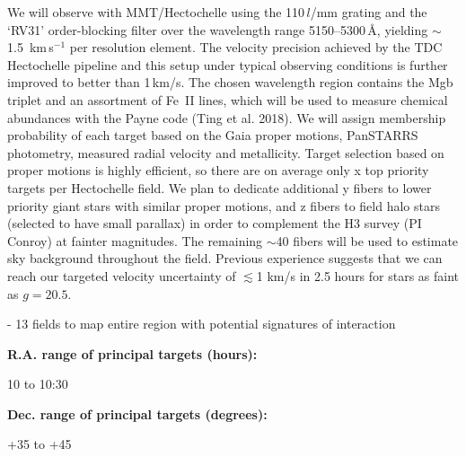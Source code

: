 \documentclass[12pt]{article}
\begin{document}
We will observe with MMT/Hectochelle using the 110\,$l$/mm grating and the `RV31' order-blocking filter over the wavelength range 5150--5300\,\AA, yielding $\sim$1.5~km\,s$^{-1}$ per resolution element.
The velocity precision achieved by the TDC Hectochelle pipeline and this setup under typical observing conditions is further improved to better than 1\,km/s.
The chosen wavelength region contains the Mgb triplet and an assortment of Fe~II lines, which will be used to measure chemical abundances with the Payne code (Ting et al. 2018).
We will assign membership probability of each target based on the Gaia proper motions, PanSTARRS photometry, measured radial velocity and metallicity.
Target selection based on proper motions is highly efficient, so there are on average only x top priority targets per Hectochelle field.
We plan to dedicate additional y fibers to lower priority giant stars with similar proper motions, and z fibers to field halo stars (selected to have small parallax) in order to complement the H3 survey (PI Conroy) at fainter magnitudes.
The remaining $\sim$40 fibers will be used to estimate sky background throughout the field.
Previous experience suggests that we can reach our targeted velocity uncertainty of $\lesssim$1 km/s in 2.5 hours for stars as faint as $g=20.5$. %

- 13 fields to map entire region with potential signatures of interaction

{\par\bf R.A. range of principal targets (hours): }10 to 10:30
{\par\bf Dec. range of principal targets (degrees): }+35 to +45

\pagebreak
\end{document}
